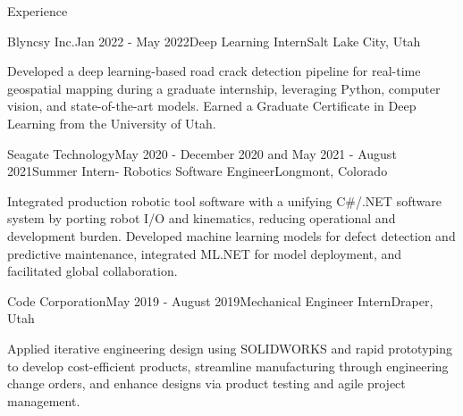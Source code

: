 \documentclass{resume}
\begin{document}
\begin{rSection}{Experience}
    \begin{rSubsection}{Blyncsy Inc.}{Jan 2022 - May 2022}{Deep Learning Intern}{Salt Lake City, Utah}
    \item Developed a deep learning-based road crack detection pipeline for real-time geospatial mapping during a graduate internship, leveraging Python, computer vision, and state-of-the-art models. Earned a Graduate Certificate in Deep Learning from the University of Utah.
    \end{rSubsection}

    \begin{rSubsection}{Seagate Technology}{May 2020 - December 2020 and May 2021 - August 2021}{Summer Intern- Robotics Software Engineer}{Longmont, Colorado}
    \item Integrated production robotic tool software with a unifying C\#/.NET software system by porting robot I/O and kinematics, reducing operational and development burden. Developed machine learning models for defect detection and predictive maintenance, integrated ML.NET for model deployment, and facilitated global collaboration.
    \end{rSubsection}

    \begin{rSubsection}{Code Corporation}{May 2019 - August 2019}{Mechanical Engineer Intern}{Draper, Utah}
    \item Applied iterative engineering design using SOLIDWORKS and rapid prototyping to develop cost-efficient products, streamline manufacturing through engineering change orders, and enhance designs via product testing and agile project management.
    \end{rSubsection}

  \end{rSection}
\end{document}

